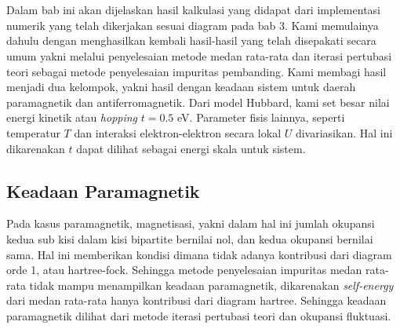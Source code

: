 \chapter{\babEmpat}
Dalam bab ini akan dijelaskan hasil kalkulasi yang didapat dari implementasi numerik yang telah dikerjakan sesuai diagram pada bab 3. Kami memulainya dahulu dengan menghasilkan kembali hasil-hasil yang telah disepakati secara umum yakni melalui penyelesaian metode medan rata-rata dan iterasi pertubasi teori sebagai metode penyelesaian impuritas pembanding. Kami membagi hasil menjadi dua kelompok, yakni hasil dengan keadaan sistem untuk daerah paramagnetik dan antiferromagnetik. Dari model Hubbard, kami set besar nilai energi kinetik atau \textit{hopping} $t = 0.5$ eV. Parameter fisis lainnya, seperti temperatur $T$ dan interaksi elektron-elektron secara lokal $U$ divariasikan. Hal ini dikarenakan $t$ dapat dilihat sebagai energi skala untuk sistem.

\section{Keadaan Paramagnetik}
Pada kasus paramagnetik, magnetisasi, yakni dalam hal ini jumlah okupansi kedua sub kisi dalam kisi bipartite bernilai nol, dan kedua okupansi bernilai sama. Hal ini memberikan kondisi dimana tidak adanya kontribusi dari diagram orde 1, atau hartree-fock. Sehingga metode penyelesaian impuritas medan rata-rata tidak mampu menampilkan keadaan paramagnetik, dikarenakan \textit{self-energy} dari medan rata-rata hanya kontribusi dari diagram hartree. Sehingga keadaan paramagnetik dilihat dari metode iterasi pertubasi teori dan okupansi fluktuasi.

